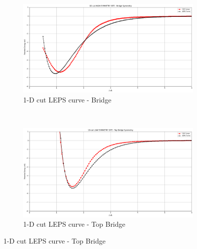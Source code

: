 \documentclass[12pt]{article}
\begin{document}
\begin{figure}[h!]
    \centering
    \begin{subfigure}[t]{0.5\textwidth}
        \centering
    \includegraphics[scale = 0.2]{1dbridge.png}
      \caption{1-D cut LEPS curve - Bridge} 
    \label{fig:8}
    \end{subfigure}%
    ~ 
    \begin{subfigure}[t]{0.5\textwidth}
        \centering
    \includegraphics[scale = 0.2]{1dtopbridge.png}
    \caption{1-D cut LEPS curve - Top Bridge} 
    \label{fig:9}
    \end{subfigure}
    
\end{figure}
\end{document}
